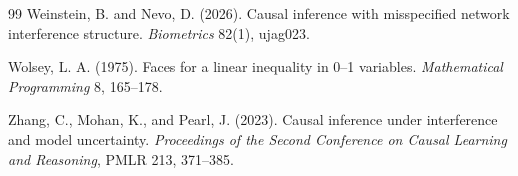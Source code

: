 \documentclass[11pt]{article}
\theoremstyle{definition}
\theoremstyle{plain}
\theoremstyle{remark}
\begin{document}
\begin{thebibliography}{99}
Weinstein, B. and Nevo, D. (2026).
Causal inference with misspecified network interference structure.
\emph{Biometrics} 82(1), ujag023.

Wolsey, L. A. (1975).
Faces for a linear inequality in 0--1 variables.
\emph{Mathematical Programming} 8, 165--178.

Zhang, C., Mohan, K., and Pearl, J. (2023).
Causal inference under interference and model uncertainty.
\emph{Proceedings of the Second Conference on Causal Learning and Reasoning},
PMLR 213, 371--385.
\end{thebibliography}
\end{document}
